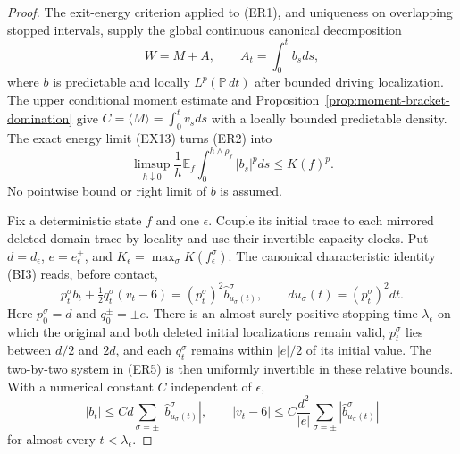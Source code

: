 \documentclass[11pt]{article}
\theoremstyle{definition}\newtheorem{definition}[theorem]{Definition}
\theoremstyle{remark}\newtheorem{remark}[theorem]{Remark}
\begin{document}
\begin{proof}
The exit-energy criterion applied to (ER1), and uniqueness on overlapping
stopped intervals, supply the global continuous canonical decomposition
\[
 W=M+A,\qquad A_t=\int_0^t b_sds,
\]
where $b$ is predictable and locally $L^p(\mathbb P\,dt)$ after bounded
driving localization. The upper conditional moment estimate and
Proposition~\ref{prop:moment-bracket-domination} give
$C=\langle M\rangle=\int_0^t v_sds$ with a locally bounded predictable
density.  The exact energy limit (EX13) turns (ER2) into
\[
 \limsup_{h\downarrow0}\frac1h
   \mathbb E_f\int_0^{h\wedge\rho_f}|b_s|^pds\le K(f)^p.
 \tag{ER4}
\]
No pointwise bound or right limit of $b$ is assumed.

Fix a deterministic state $f$ and one $\epsilon$. Couple its initial
trace to each mirrored deleted-domain trace by locality and use their
invertible capacity clocks. Put $d=d_\epsilon$,
$e=e_\epsilon^+$, and
$K_\epsilon=\max_\sigma K(f_\epsilon^\sigma)$.
The canonical characteristic identity (BI3) reads, before contact,
\[
 p_t^\sigma b_t+\tfrac12q_t^\sigma(v_t-6)
        =(p_t^\sigma)^2\widehat b^\sigma_{u_\sigma(t)},
 \qquad du_\sigma(t)=(p_t^\sigma)^2dt.
 \tag{ER5}
\]
Here $p_0^\sigma=d$ and $q_0^\pm=\pm e$. There is an almost surely
positive stopping time $\lambda_\epsilon$ on which the original and
both deleted initial localizations remain valid, $p_t^\sigma$ lies
between $d/2$ and $2d$, and each $q_t^\sigma$ remains within
$|e|/2$ of its initial value. The two-by-two system in (ER5) is then
uniformly invertible in these relative bounds. With a numerical constant
$C$ independent of $\epsilon$,
\[
 |b_t|\le Cd\sum_{\sigma=\pm}
                 |\widehat b^\sigma_{u_\sigma(t)}|,
 \qquad
 |v_t-6|\le C\frac{d^2}{|e|}\sum_{\sigma=\pm}
                 |\widehat b^\sigma_{u_\sigma(t)}|
 \tag{ER6}
\]
for almost every $t<\lambda_\epsilon$.


\end{proof}
\end{document}
